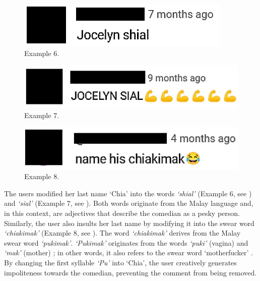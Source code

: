 \documentclass[english]{textolivre}
\begin{document}
\begin{figure}[h!]
    \centering
    \begin{minipage}{0.30\linewidth}
    \includegraphics[width=\linewidth]{imagens/exemplo6.png}
    \caption{Example 6.}\label{example-6}
    \end{minipage}
\end{figure}

\begin{figure}[h!]
    \centering
    \begin{minipage}{0.30\linewidth}
    \includegraphics[width=\linewidth]{imagens/exemplo7.png}
    \caption{Example 7.}\label{example-7}
    \end{minipage}
\end{figure}

\begin{figure}[h!]
    \centering
    \begin{minipage}{0.30\linewidth}
    \includegraphics[width=\linewidth]{imagens/exemplo8.png}
    \caption{Example 8.}\label{example-8}
    \end{minipage}
\end{figure}

The users modified her last name ‘Chia’ into the words \textit{‘shial’} (Example 6, see ) and \textit{‘sial’} (Example 7, see ). Both words originate from the Malay language and, in this context, are adjectives that describe the comedian as a pesky person. Similarly, the user also insults her last name by modifying it into the swear word \textit{‘chiakimak’} (Example 8, see ). The word \textit{‘chiakimak’} derives from the Malay swear word \textit{‘pukimak’}. \textit{‘Pukimak’} originates from the words \textit{‘puki’} (vagina) and \textit{‘mak’} (mother) \cite{beden2022}; in other words, it also refers to the swear word ‘motherfucker’ \cite{wanmahmood2019}. By changing the first syllable \textit{‘Pu’} into ‘Chia’, the user creatively generates impoliteness towards the comedian, preventing the comment from being removed.
\end{document}

